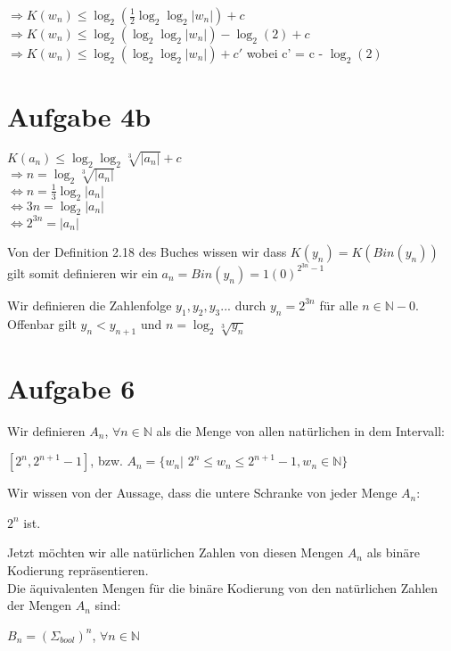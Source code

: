 \documentclass{article}
\begin{document}
    \par
	
	$\Rightarrow K(w_{n}) \le \log_{2}(\frac{1}{2} \log_{2} \log_{2} |w_{n}|) + c$ \\
	$\Rightarrow K(w_{n}) \le \log_{2}(\log_{2} \log_{2} |w_{n}|) - \log_{2}(2) + c$ \\
	$\Rightarrow K(w_{n}) \le \log_{2}(\log_{2} \log_{2} |w_{n}|) + c'$ wobei c' = c - $\log_{2}(2)$
	
	\section*{Aufgabe 4b}
	
	$K(a_{n}) \le \log_{2} \log_{2} \sqrt[3]{|a_{n}|} + c$ \\
	$\Rightarrow n =  \log_{2} \sqrt[3]{|a_{n}|}$ \\
	$\Leftrightarrow n = \frac{1}{3} \log_{2} |a_{n}| $ \\
	$\Leftrightarrow 3n = \log_{2} |a_{n}| $ \\
	$\Leftrightarrow 2^{3n} = |a_{n}| $
	
	 
	
	Von der Definition 2.18 des Buches wissen wir dass $K(y_{n}) = K(Bin(y_{n}))$ gilt somit definieren wir ein $a_{n} = Bin(y_{n}) = 1(0)^{2^{3n} - 1}$
    
    Wir definieren die Zahlenfolge $y_{1}, y_{2}, y_{3}...$ durch $y_{n} = 2^{3n}$ für alle $ n \in \mathbb{N} - {0}$.
    Offenbar gilt $y_{n} < y_{n+1}$ und $n = \log_{2} \sqrt[3]{y_{n}}$
    
    \section*{Aufgabe 6}
    
    Wir definieren $A_{n}$, $\forall n \in \mathbb{N}$ als die Menge von allen natürlichen in dem Intervall:
    \begin{center}
    $[2^n, 2^{n+1} - 1]$, bzw. $A_{n} = \{w_{n}|$ $2^n \le w_{n} \le 2^{n+1} - 1, w_{n} \in \mathbb{N}\}$
    \end{center}
    
    
    \par 
    \noindent
    Wir wissen von der Aussage, dass die untere Schranke von jeder Menge $A_{n}$: 
	\begin{center}
	$2^n$ ist. \\
\end{center}	    
   
   	\noindent
    Jetzt möchten wir alle natürlichen Zahlen von diesen Mengen $A_{n}$ als binäre Kodierung repräsentieren. \\
    Die äquivalenten Mengen für die binäre Kodierung von den natürlichen Zahlen der Mengen $A_{n}$ sind:
	\begin{center}
	 $B_{n} = (\Sigma_{bool})^n $, $\forall n \in \mathbb{N}$
\end{center}	    
    
\end{document}
